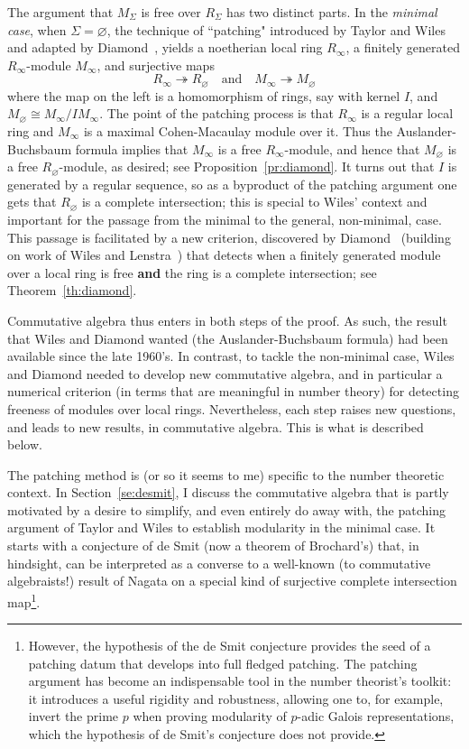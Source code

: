 \documentclass[twoside,leqno]{article}
\begin{document}
The argument that $M_\Sigma$ is free over $R_\Sigma$ has two distinct parts. In the \emph{minimal case}, when $\Sigma=\varnothing$, the technique of ``patching"
introduced by Taylor and Wiles~\cite{Taylor/Wiles:1995} and adapted by Diamond~\cite{Diamond:1997}, yields a noetherian local ring $R_{\infty}$, a finitely generated $R_{\infty}$-module $M_{\infty}$, and surjective maps 
\[
R_{\infty} \twoheadrightarrow R_{\varnothing} \quad \text{and}\quad M_{\infty} \twoheadrightarrow M_{\varnothing}
\]
where the map on the left is a homomorphism of rings, say with kernel $I$, and $M_{\varnothing}\cong M_{\infty}/I M_{\infty}$. The point of the patching process is that $R_{\infty}$ is a regular local ring and $M_{\infty}$ is a maximal Cohen-Macaulay module over it. Thus the Auslander-Buchsbaum formula implies that $M_{\infty}$ is a free $R_{\infty}$-module, and hence that $M_{\varnothing}$ is a free $R_{\varnothing}$-module, as desired; see Proposition~\ref{pr:diamond}. It turns out that $I$ is generated by a regular sequence, so as a byproduct of the patching argument one gets that $R_{\varnothing}$ is a complete intersection; this is special to Wiles' context and important for the passage from the minimal to the general, non-minimal, case. This passage is facilitated by a new criterion, discovered by Diamond~\cite{Diamond:1997} (building on work of Wiles and Lenstra~\cite{Lenstra:1995}) that detects when a finitely generated module over a local ring is free \textbf{and} the ring is a complete intersection; see Theorem~\ref{th:diamond}.

Commutative algebra thus enters in both steps of the proof. As such, the result that Wiles and Diamond wanted (the Auslander-Buchsbaum formula) had been available since the late 1960's.  In contrast, to tackle the non-minimal case, Wiles and Diamond  needed to develop new commutative algebra, and in particular  a numerical criterion  (in terms that are meaningful in number theory) for detecting freeness of modules over local rings. Nevertheless, each step raises new questions, and leads to new results, in commutative algebra. This is what is described below.

The patching method is (or so it seems to me) specific to the number theoretic context. In Section~\ref{se:desmit}, I discuss the commutative algebra that is partly motivated by a desire to simplify, and even entirely do away with, the patching argument of Taylor and Wiles to establish modularity in the minimal case. It starts with a conjecture  of de Smit (now a theorem of Brochard's) that, in hindsight, can be interpreted as a converse to a well-known (to commutative algebraists!) result of Nagata on a special kind of surjective complete intersection map\footnote{However, the hypothesis of the de Smit conjecture provides the seed of a patching datum that develops into full fledged patching. The patching argument has become an indispensable tool in the number theorist's toolkit: it introduces a useful rigidity and robustness, allowing one to, for example, invert the prime $p$ when proving modularity of $p$-adic Galois representations, which the hypothesis of de Smit's conjecture does not provide.}.
\end{document}
